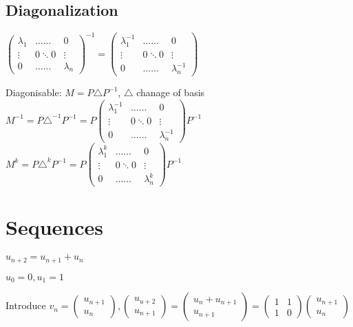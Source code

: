 \documentclass{article}
\begin{document}
    \subsection{Diagonalization}
    $\begin{pmatrix}
        \lambda_1 & \ldots\ldots & 0 \\
        \vdots & 0 \ddots 0 & \vdots \\
        0 & \ldots\ldots & \lambda_n
    \end{pmatrix}^{-1}=
    \begin{pmatrix}
        \lambda_1^{-1} & \ldots\ldots & 0 \\
        \vdots & 0 \ddots 0 & \vdots \\
        0 & \ldots\ldots & \lambda_n^{-1}
    \end{pmatrix}$

    Diagonisable: $M=P\triangle P^{-1}$, $\triangle$ chanage of basis \\

    $    M^{-1} = P\triangle^{-1} P^{-1}
          = P\begin{pmatrix}
             \lambda_1^{-1} & \ldots\ldots & 0 \\
        \vdots & 0 \ddots 0 & \vdots \\
        0 & \ldots\ldots & \lambda_n^{-1}
         \end{pmatrix} P^{-1}
    $\\
    
    $M^{k} = P\triangle^k P^{-1} = P\begin{pmatrix}
             \lambda_1^k & \ldots\ldots & 0 \\
        \vdots & 0 \ddots 0 & \vdots \\
        0 & \ldots\ldots & \lambda_n^k
         \end{pmatrix} P^{-1}$

\section{Sequences}
\hspace{10pt}$u_{n+2}=u_{n+1}+u_n$

$u_0=0, u_1 = 1$

Introduce $v_n=\begin{pmatrix}
     u_{n+1} \\
     u_n
\end{pmatrix}, \begin{pmatrix}
     u_{u+2} \\
        u_{n+1}
\end{pmatrix}=\begin{pmatrix}
    u_n+u_{n+1} \\
    u_{n+1}
\end{pmatrix} = \begin{pmatrix}
    1 & 1 \\
    1 & 0
\end{pmatrix}\begin{pmatrix}
    u_{n+1} \\
    u_n
\end{pmatrix}$ \\
\end{document}
